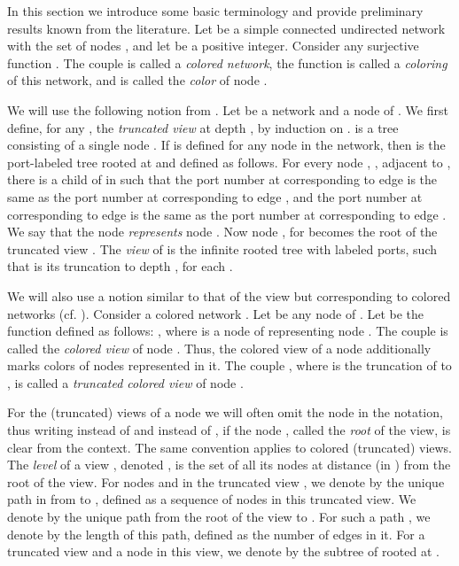 \documentclass[a4paper,10pt]{article}
\begin{document}
In this section we introduce some basic terminology and provide preliminary  results known from the literature. Let  be a simple connected undirected network with the set of nodes , and let  be a positive integer.
Consider any surjective function .
The couple  is called a {\em colored network}, the function  is called a
{\em coloring} of this network, and  is called the {\em color} of node . 



We will use the following notion from \cite{YK3}. Let  be a network and  a node of .  We first define, for any ,  the {\em truncated view}
 at depth , by induction on .  is a tree consisting of a single node . 
If  is defined for any node  in the network, then  is the port-labeled tree
rooted at  and defined as follows.
For every node , , adjacent to , 
there is a child  of  in  such that the port number at  corresponding to edge  is the same as the port number 
at  corresponding to edge ,
and the port number at  corresponding to edge  is the same as the port number at  corresponding to edge .  We say that the node  {\em represents} node .
Now node , for  becomes 
the root of the truncated view .   
 The {\em view} of  is the infinite rooted tree  with labeled ports, such that  is its truncation to depth , for each .

We will also use a notion similar to that of the view but corresponding to colored networks (cf. \cite{Norris}). Consider a colored network . Let  be any node of . 
Let  be the function defined as follows:
, where   is a node of  representing node .
The couple  is called the {\em colored view} of node .
Thus, the colored view of a node additionally marks colors of nodes represented in it.
The couple , where  is the truncation of  to , is called a 
{\em truncated  colored view} of node .

For the (truncated) views of a node  we will often omit the node  in the notation,
thus writing  instead of  and  instead of , if the node , called
the {\em root} of the view, is clear from the context. The same convention applies to 
colored (truncated) views. The \emph{level}  of a view , denoted , is the set of all its nodes at distance  (in ) from the root of the view. For nodes  and  in the truncated view , we denote by  the unique path in  from  to ,
defined as a sequence of nodes in this truncated view. We denote by  the unique path from the root of the view to . For such a path , we denote by  the length of this path,
defined as the number of edges in it. For a truncated view  and a node  in this view,
we denote by  the subtree of   rooted at .
\end{document}
